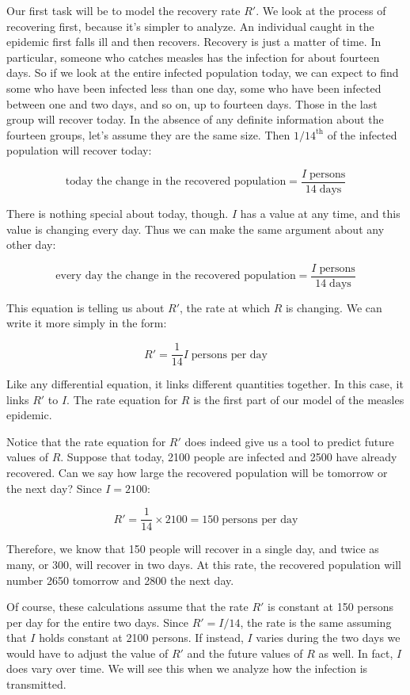 \documentclass
[justified,nohyper]
{tufte-handout}
\begin{document}
Our first task will be to model the recovery rate $R'$. We look at the process of 
recovering first, because it's simpler to analyze. An individual caught in the 
epidemic first falls ill and then recovers. Recovery is just a matter of time. In 
particular, someone who catches measles has the infection for about fourteen 
days. So if we look at the entire infected population today, we can expect to 
find some who have been infected less than one day, some who have been infected 
between one and two days, and so on, up to fourteen days. Those in the last group 
will recover today. In the absence of any definite information about the fourteen 
groups, let's assume they are the same size. Then $1/14^{\text{th}}$ of the 
infected population will recover today:

\[
    \text{today the change in the recovered population} = 
    \dfrac{I\;\text{persons}}{14\;\text{days}}
\]

There is nothing special about today, though. $I$ has a value at any time, and this
value is changing every day. Thus 
we can make the same argument about any other day:

\[
    \text{every day the change in the recovered population} = 
    \dfrac{I\;\text{persons}}{14\;\text{days}}
\]

This equation is telling us about $R'$, the rate at which $R$ is changing. We can write it more simply in the form:

\[
    R' = \dfrac{1}{14}I \; \text{persons per day}
\]

Like any differential 
equation, it links different quantities together. In this case, it links $R'$ to 
$I$. The rate equation for $R$ is the first part of our model of the measles 
epidemic.

Notice that the rate equation for $R'$ does indeed give us a tool to predict 
future values of $R$. Suppose that today, 2100 people are infected and 2500 have 
already recovered. Can we say how large the recovered population will be tomorrow 
or the next day? Since $I=2100$:

\[
    R' = \dfrac{1}{14} \times 2100 = 150\;\text{persons per day}
\]

Therefore, we know that 150 people will recover in a single day, and twice as 
many, or 300, will recover in two days. At this rate, the recovered population 
will number 2650 tomorrow and 2800 the next day.

Of course, these calculations assume that the rate $R'$ is constant at 150 
persons per day for the entire two days. Since $R'=I/14$, the rate is the same 
assuming that $I$ holds constant at 2100 persons. If instead, $I$ varies during 
the two days we would have to adjust the value of $R'$ and the future values of 
$R$ as well. In fact, $I$ does vary over time. We will see this when we analyze 
how the infection is transmitted.
\end{document}
